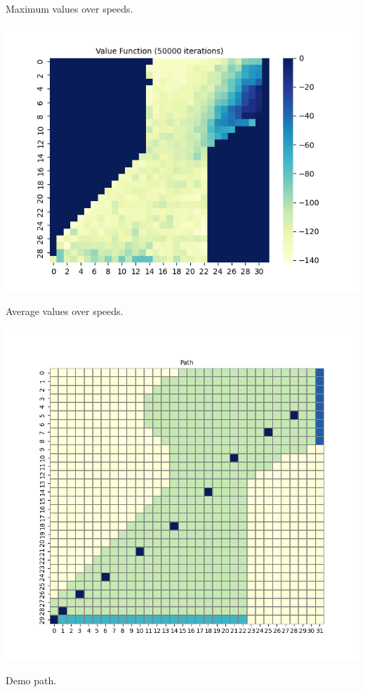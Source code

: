 \documentclass[11pt]{article}
\begin{document}
    Maximum values over speeds.

    \includegraphics[scale=0.7]{env3_5_3_1_avg}

    Average values over speeds.

    \includegraphics[scale=0.7]{env3_demo_e_5_12_0}

    Demo path.
\end{document}
